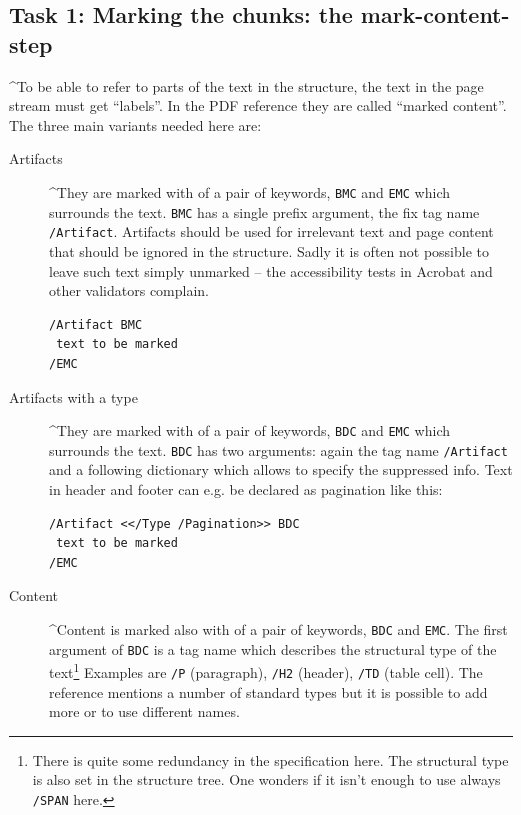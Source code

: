 \documentclass[DIV=12,parskip=half-,bibliography=totoc]{scrartcl}
\newcommand\PDF{PDF}
\begin{document}
\subsection{Task 1: Marking the chunks: the mark-content-step}

\TagP^To be able to refer to parts of the text in the structure, the text in the page stream must get \enquote{labels}. In the \PDF{} reference they are called \enquote{marked content}. The three main variants needed here are:\TagPend

\begin{description}
\item[Artifacts] \TagP^They are marked with of a pair of keywords, \texttt{BMC} and \texttt{EMC} which surrounds the text. \texttt{BMC} has a single prefix argument, the fix tag name \texttt{/Artifact}. Artifacts should be used for irrelevant text and page content that should be ignored in the structure. Sadly it is often not possible to leave such text simply unmarked -- the accessibility tests in Acrobat and other validators complain.\TagPend

\begin{lstlisting}
/Artifact BMC
 text to be marked
/EMC
\end{lstlisting}
\tagmcend\tagstructend\meti



\item[Artifacts with a type] \TagP^They are marked with of a pair of keywords, \texttt{BDC} and \texttt{EMC} which surrounds the text. \texttt{BDC} has two arguments: again the tag name \texttt{/Artifact} and a following dictionary which allows to specify the suppressed info. Text in header and footer can e.g. be declared as pagination like this:\TagPend

\begin{lstlisting}
/Artifact <</Type /Pagination>> BDC
 text to be marked
/EMC
\end{lstlisting}
\tagmcend\tagstructend\meti


\item[Content]  \TagP^Content is marked also with of a pair of keywords, \texttt{BDC} and \texttt{EMC}. The first argument of \texttt{BDC} is a tag name which describes the structural type of the text\footnote{There is quite some redundancy in the specification here. The structural type is also set in the structure tree. One wonders if it isn't enough to use  always \texttt{/SPAN} here.}
    Examples are \texttt{/P} (paragraph), \texttt{/H2} (header), \texttt{/TD} (table cell). The reference mentions a number of standard types but it is possible to add more or to use different names.


\end{description}
\end{document}
